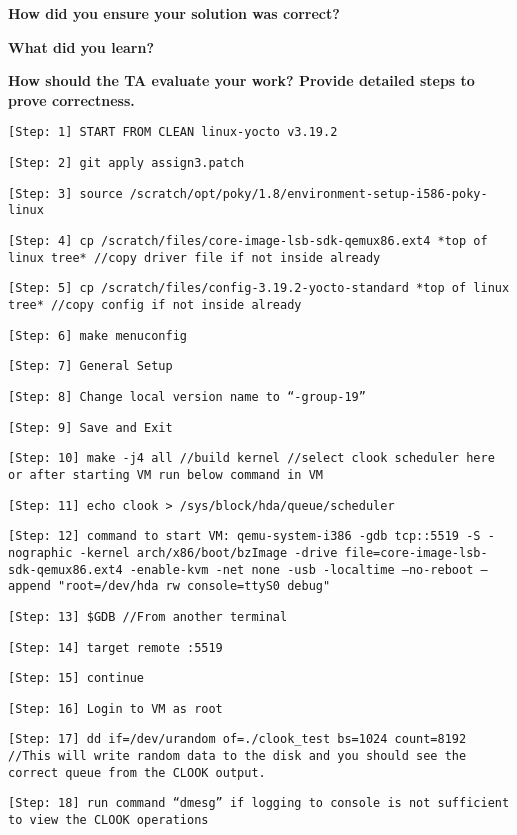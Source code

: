 \documentclass[10pt,letterpaper,draftclsnofoot,onecolumn]{IEEEtran}
\begin{document}
\noindent\textbf{How did you ensure your solution was correct?}

\indent{}

\noindent\textbf{What did you learn?}

\indent{}

\noindent\textbf{How should the TA evaluate your work? Provide detailed steps to prove correctness.}
\begin{description}
\item \texttt{[Step: 1] START FROM CLEAN linux-yocto v3.19.2}
\item \texttt{[Step: 2] git apply assign3.patch}
\item \texttt{[Step: 3] source /scratch/opt/poky/1.8/environment-setup-i586-poky-linux}
\item \texttt{[Step: 4] cp /scratch/files/core-image-lsb-sdk-qemux86.ext4 *top of linux tree* \newline //copy driver file if not inside already}
\item \texttt{[Step: 5] cp /scratch/files/config-3.19.2-yocto-standard *top of linux tree* \newline//copy config if not inside already}
\item \texttt{[Step: 6] make menuconfig}
\item \texttt{[Step: 7] General Setup}
\item \texttt{[Step: 8] Change local version name to “-group-19”}
\item \texttt{[Step: 9] Save and Exit}
\item \texttt{[Step: 10] make -j4 all \newline //build kernel \newline //select clook scheduler here or after starting VM run below command in VM}
\item \texttt{[Step: 11] echo clook > /sys/block/hda/queue/scheduler}
\item \texttt{[Step: 12] command to start VM: \newline qemu-system-i386 -gdb tcp::5519 -S -nographic -kernel arch/x86/boot/bzImage -drive file=core-image-lsb-sdk-qemux86.ext4 -enable-kvm -net none -usb -localtime --no-reboot --append "root=/dev/hda rw console=ttyS0 debug"}
\item \texttt{[Step: 13] \$GDB \newline //From another terminal}
\item \texttt{[Step: 14] target remote :5519}
\item \texttt{[Step: 15] continue}
\item \texttt{[Step: 16] Login to VM as root}
\item \texttt{[Step: 17] dd if=/dev/urandom of=./clook\_test bs=1024 count=8192 \newline //This will write random data to the disk and you should see the correct queue from the CLOOK output.} 
\item \texttt{[Step: 18] run command “dmesg” if logging to console is not sufficient to view the CLOOK operations}

\end{description}



\end{document}
